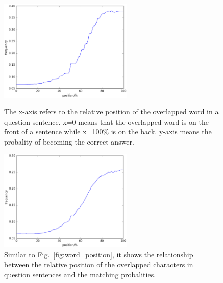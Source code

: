 \documentclass{llncs}
\begin{document}
\begin{figure}[htb]
	\begin{minipage}[t]{0.5\linewidth} 
	\subfigure

		\includegraphics[width=2.5in]{figures/word_position.eps}
		\caption{The x-axis refers to the relative position of the overlapped word in a question sentence. x=0 means that the overlapped word is on the front of a sentence  while x=100\% is on the back. y-axis means the probality of becoming the correct answer.}
		\label{fig:word_position}
	\end{minipage}
	\hspace{1ex}  
	\begin{minipage}[t]{0.5\linewidth} 
	\subfigure
	\centering
		\includegraphics[width=2.5in]{figures/character_position.eps}
		\caption{Similar to Fig.~\ref{fig:word_position}, it shows the relationship between the relative position of the overlapped characters in question sentences and the matching probalities.}
		\label{fig:character_position}
	\end{minipage} 
\end{figure}
\end{document}
